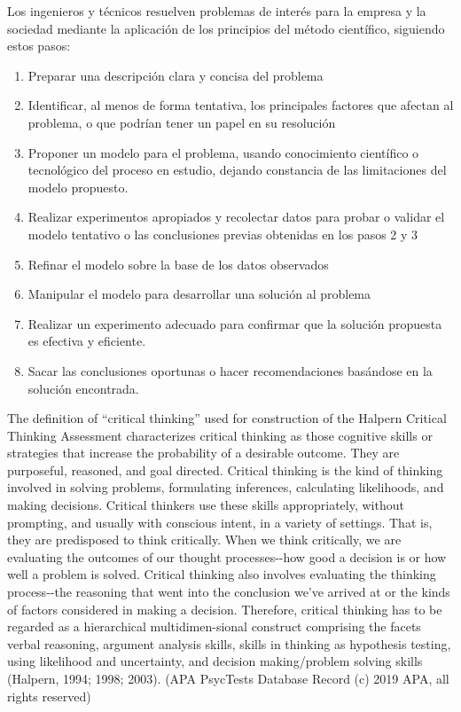 \documentclass[
  letterpaper,
  DIV=11,
  numbers=noendperiod,
  oneside]{scrreprt}
\providecommand{\tightlist}{%
  \setlength{\itemsep}{0pt}\setlength{\parskip}{0pt}}\usepackage{longtable,booktabs,array}
\begin{document}
Los ingenieros y técnicos resuelven problemas de interés para la empresa
y la sociedad mediante la aplicación de los principios del método
científico, siguiendo estos pasos:
{}

\begin{enumerate}
\def\labelenumi{\arabic{enumi}.}
\tightlist
\item
  Preparar una descripción clara y concisa del problema
\item
  Identificar, al menos de forma tentativa, los principales factores que
  afectan al problema, o que podrían tener un papel en su resolución
\item
  Proponer un modelo para el problema, usando conocimiento científico o
  tecnológico del proceso en estudio, dejando constancia de las
  limitaciones del modelo propuesto.
\item
  Realizar experimentos apropiados y recolectar datos para probar o
  validar el modelo tentativo o las conclusiones previas obtenidas en
  los pasos 2 y 3
\item
  Refinar el modelo sobre la base de los datos observados
\item
  Manipular el modelo para desarrollar una solución al problema
\item
  Realizar un experimento adecuado para confirmar que la solución
  propuesta es efectiva y eficiente.
\item
  Sacar las conclusiones oportunas o hacer recomendaciones basándose en
  la solución encontrada.
\end{enumerate}

The definition of ``critical thinking'' used for construction of the
Halpern Critical Thinking Assessment characterizes critical thinking as
those cognitive skills or strategies that increase the probability of a
desirable outcome. They are purposeful, reasoned, and goal directed.
Critical thinking is the kind of thinking involved in solving problems,
formulating inferences, calculating likelihoods, and making decisions.
Critical thinkers use these skills appropriately, without prompting, and
usually with conscious intent, in a variety of settings. That is, they
are predisposed to think critically. When we think critically, we are
evaluating the outcomes of our thought processes-\/-how good a decision
is or how well a problem is solved. Critical thinking also involves
evaluating the thinking process-\/-the reasoning that went into the
conclusion we've arrived at or the kinds of factors considered in making
a decision. Therefore, critical thinking has to be regarded as a
hierarchical multidimen-sional construct comprising the facets verbal
reasoning, argument analysis skills, skills in thinking as hypothesis
testing, using likelihood and uncertainty, and decision making/problem
solving skills (Halpern, 1994; 1998; 2003). (APA PsycTests Database
Record (c) 2019 APA, all rights reserved)
\end{document}

